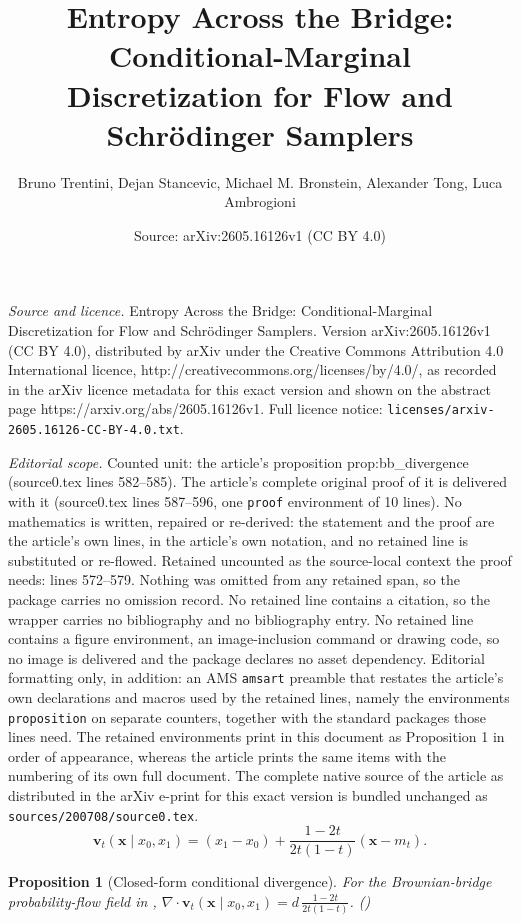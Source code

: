 \documentclass[10pt,a4paper]{amsart}
\title{Entropy Across the Bridge: Conditional-Marginal Discretization for Flow and Schr\"odinger Samplers}
\author{Bruno Trentini, Dejan Stancevic, Michael M. Bronstein, Alexander Tong, Luca Ambrogioni}
\date{Source: arXiv:2605.16126v1 (CC BY 4.0)}
\newtheorem{proposition}{Proposition}
\newcommand{\diver}{\nabla\!\cdot}
\newcommand{\inlineeqtag}[1]{\refstepcounter{equation}\label{#1}\nobreak\hfill\textup{(\theequation)}\par}
\newcommand{\vv}{\bm{v}}
\newcommand{\vx}{\bm{x}}
\begin{document}
\maketitle

\noindent\emph{Source and licence.} Entropy Across the Bridge: Conditional-Marginal Discretization for Flow and Schr\"odinger Samplers. Version arXiv:2605.16126v1 (CC BY 4.0), distributed by arXiv under the Creative Commons Attribution 4.0 International licence, http://creativecommons.org/licenses/by/4.0/, as recorded in the arXiv licence metadata for this exact version and shown on the abstract page https://arxiv.org/abs/2605.16126v1. Full licence notice: \texttt{licenses/arxiv-2605.16126-CC-BY-4.0.txt}.\par\smallskip

\noindent\textit{Editorial scope.} Counted unit: the article's proposition prop:bb\_divergence (source0.tex lines 582--585). The article's complete original proof of it is delivered with it (source0.tex lines 587--596, one \texttt{proof} environment of 10 lines). No mathematics is written, repaired or re-derived: the statement and the proof are the article's own lines, in the article's own notation, and no retained line is substituted or re-flowed.  Retained uncounted as the source-local context the proof needs: lines 572--579.  Nothing was omitted from any retained span, so the package carries no omission record.  No retained line contains a citation, so the wrapper carries no bibliography and no bibliography entry.  No retained line contains a figure environment, an image-inclusion command or drawing code, so no image is delivered and the package declares no asset dependency.  Editorial formatting only, in addition: an AMS \texttt{amsart} preamble that restates the article's own declarations and macros used by the retained lines, namely the environments \texttt{proposition} on separate counters, together with the standard packages those lines need.  The retained environments print in this document as Proposition 1 in order of appearance, whereas the article prints the same items with the numbering of its own full document.  The complete native source of the article as distributed in the arXiv e-print for this exact version is bundled unchanged as \texttt{sources/200708/source0.tex}.
\begin{equation}
  \vv_t(\vx\mid x_0,x_1)
  =
  (x_1-x_0)
  +
  \frac{1-2t}{2t(1-t)}(\vx-m_t).
  \label{eq:bb_ode_field}
\end{equation}

\begin{proposition}[Closed-form conditional divergence]
    \label{prop:bb_divergence}
    For the Brownian-bridge probability-flow field in , \(\displaystyle \diver \vv_t(\vx\mid x_0,x_1)=d\,\frac{1-2t}{2t(1-t)}\). \inlineeqtag{eq:bb_divergence}
    \end{proposition}
\end{document}
